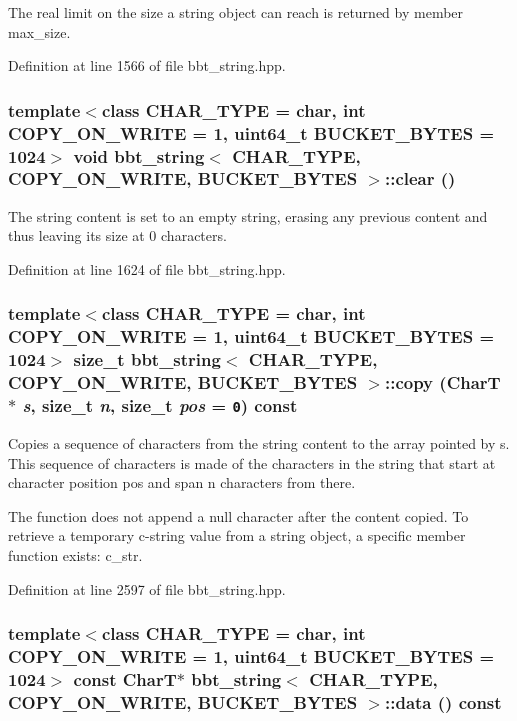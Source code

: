 The real limit on the size a string object can reach is returned by member max\_\-size. 

Definition at line 1566 of file bbt\_\-string.hpp.\hypertarget{classbbt__string_7cf658cb2b605dbc1c808e41f9e65b2d}{
\subsubsection[{clear}]{\setlength{\rightskip}{0pt plus 5cm}template$<$class CHAR\_\-TYPE  = char, int COPY\_\-ON\_\-WRITE = 1, uint64\_\-t BUCKET\_\-BYTES = 1024$>$ void {\bf bbt\_\-string}$<$ CHAR\_\-TYPE, COPY\_\-ON\_\-WRITE, BUCKET\_\-BYTES $>$::clear ()}}
\label{classbbt__string_7cf658cb2b605dbc1c808e41f9e65b2d}


The string content is set to an empty string, erasing any previous content and thus leaving its size at 0 characters. 

Definition at line 1624 of file bbt\_\-string.hpp.\hypertarget{classbbt__string_0873ce9d57fa0817c63678cf42bb6ff6}{
\subsubsection[{copy}]{\setlength{\rightskip}{0pt plus 5cm}template$<$class CHAR\_\-TYPE  = char, int COPY\_\-ON\_\-WRITE = 1, uint64\_\-t BUCKET\_\-BYTES = 1024$>$ size\_\-t {\bf bbt\_\-string}$<$ CHAR\_\-TYPE, COPY\_\-ON\_\-WRITE, BUCKET\_\-BYTES $>$::copy (CharT $\ast$ {\em s}, \/  size\_\-t {\em n}, \/  size\_\-t {\em pos} = {\tt 0}) const}}
\label{classbbt__string_0873ce9d57fa0817c63678cf42bb6ff6}


Copies a sequence of characters from the string content to the array pointed by s. This sequence of characters is made of the characters in the string that start at character position pos and span n characters from there.

The function does not append a null character after the content copied. To retrieve a temporary c-string value from a string object, a specific member function exists: c\_\-str. 

Definition at line 2597 of file bbt\_\-string.hpp.\hypertarget{classbbt__string_bd225f98ab68e2385b6d3e23bd4719cb}{
\subsubsection[{data}]{\setlength{\rightskip}{0pt plus 5cm}template$<$class CHAR\_\-TYPE  = char, int COPY\_\-ON\_\-WRITE = 1, uint64\_\-t BUCKET\_\-BYTES = 1024$>$ const CharT$\ast$ {\bf bbt\_\-string}$<$ CHAR\_\-TYPE, COPY\_\-ON\_\-WRITE, BUCKET\_\-BYTES $>$::data () const}}
\label{classbbt__string_bd225f98ab68e2385b6d3e23bd4719cb}


